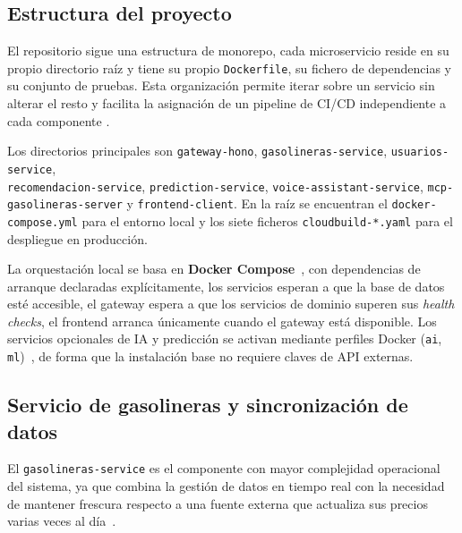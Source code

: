 \subsection{Estructura del proyecto}
\label{subsec:estructura}

El repositorio sigue una estructura de monorepo, cada microservicio reside en su propio
directorio raíz y tiene su propio \texttt{Dockerfile}, su fichero de dependencias y su
conjunto de pruebas. Esta organización permite iterar sobre un servicio sin alterar el
resto y facilita la asignación de un pipeline de CI/CD independiente a cada componente \cite{newman2021building}.

Los directorios principales son \texttt{gateway-hono}, \texttt{gasolineras-service},
\texttt{usuarios-service}, \\
\texttt{recomendacion-service}, \texttt{prediction-service},
\texttt{voice-assistant-service}, \texttt{mcp-gasolineras-server} y
\texttt{frontend-client}. En la raíz se encuentran el \texttt{docker-compose.yml} para el
entorno local y los siete ficheros \texttt{cloudbuild-*.yaml} para el despliegue en
producción.

La orquestación local se basa en \textbf{Docker Compose}~\cite{docker_compose}, con
dependencias de arranque declaradas explícitamente, los servicios esperan a que
la base de datos esté accesible, el gateway espera a que los servicios de dominio superen
sus \textit{health checks}, el frontend arranca únicamente cuando el gateway está
disponible. Los servicios opcionales de IA y predicción se activan mediante perfiles Docker
(\texttt{ai}, \texttt{ml})~\cite{docker_compose_profiles}, de forma que la instalación base no requiere claves de API
externas.

\subsection{Servicio de gasolineras y sincronización de datos}
\label{subsec:gasolineras_impl}

El \texttt{gasolineras-service} es el componente con mayor complejidad operacional del
sistema, ya que combina la gestión de datos en tiempo real con la necesidad de mantener
frescura respecto a una fuente externa que actualiza sus precios varias veces al
día~\cite{datosgob_carburantes}.


